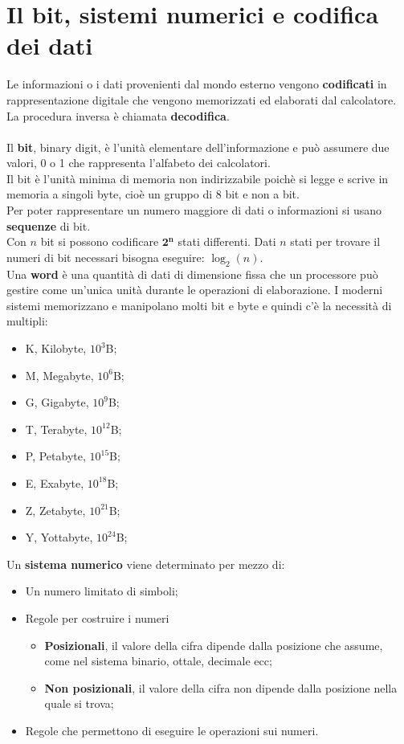 \documentclass[12pt]{report}
\begin{document}
		\section{Il bit, sistemi numerici e codifica dei dati}
		Le informazioni o i dati provenienti dal mondo esterno vengono \textbf{codificati} in rappresentazione digitale che vengono memorizzati ed elaborati dal calcolatore. La procedura inversa è chiamata \textbf{decodifica}.
		\\
		\\
		Il \textbf{bit}, binary digit, è l'unità elementare dell'informazione e può assumere due valori, 0 o 1 che rappresenta l'alfabeto dei calcolatori.
		\\
		Il bit è l'unità minima di memoria non indirizzabile poichè si legge e scrive in memoria a singoli byte, cioè un gruppo di 8 bit e non a bit.
		\\
		Per poter rappresentare un numero maggiore di dati o informazioni si usano \textbf{sequenze} di bit.
		\\
		Con $n$ bit si possono codificare $\mathbf{2^n}$ stati differenti.
		Dati $n$ stati per trovare il numeri di bit necessari bisogna eseguire: $\log_2(n)$.
		\\
		Una \textbf{word} è una quantità di dati di dimensione fissa che un processore può gestire come un'unica unità durante le operazioni di elaborazione.
		I moderni sistemi memorizzano e manipolano molti bit e byte e quindi c'è la necessità di multipli:
		\begin{itemize}
			\item K, Kilobyte, $10^{3}$B;
			\item M, Megabyte, $10^{6}$B;
			\item G, Gigabyte, $10^{9}$B;
			\item T, Terabyte, $10^{12}$B;
			\item P, Petabyte, $10^{15}$B;
			\item E, Exabyte, $10^{18}$B;
			\item Z, Zetabyte, $10^{21}$B;
			\item Y, Yottabyte, $10^{24}$B;
		\end{itemize}
		Un \textbf{sistema numerico} viene determinato per mezzo di:
		\begin{itemize}
			\item Un numero limitato di simboli;
			\item Regole per costruire i numeri
				\begin{itemize}
					\item \textbf{Posizionali}, il valore della cifra dipende dalla posizione che assume, come nel sistema binario, ottale, decimale ecc;
					\item \textbf{Non posizionali}, il valore della cifra non dipende dalla posizione nella quale si trova;
				\end{itemize}
			\item Regole che permettono di eseguire le operazioni sui numeri.
		\end{itemize}
\end{document}
